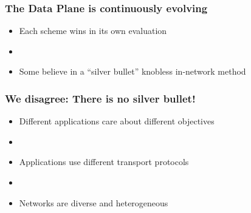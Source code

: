 \begin{frame}[plain]
\frametitle{The Data Plane is continuously evolving}
\begin{itemize}
\item Each scheme wins in its own evaluation

\item[]

\item Some believe in a ``silver bullet'' knobless in-network method

\end{itemize}
\end{frame}

\begin{frame}[plain]
\frametitle{We disagree: There is no silver bullet!}
\begin{itemize}
\item{Different applications care about different objectives}

\item[]

\item{Applications use different transport protocols}
\item[]

\item{Networks are diverse and heterogeneous}

\end{itemize}
\end{frame}

